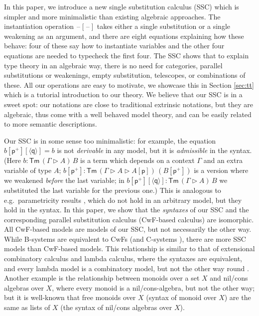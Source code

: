 \documentclass[a4paper,UKenglish,cleveref, autoref, thm-restate]{lipics-v2021}
\newcommand{\Tm}{\mathsf{Tm}}
\newcommand{\p}{\mathsf{p}}
\newcommand{\q}{\mathsf{q}}
\newcommand{\ext}{\mathop{\triangleright}}
\newcommand{\blank}{\mathord{\hspace{1pt}\text{--}\hspace{1pt}}} %
\begin{document}
In this paper, we introduce a new single substitution calculus (SSC)
which is simpler and more minimalistic than existing algebraic
approaches. The instantiation operation $\blank[\blank]$ takes either a
single substitution or a single weakening as an argument, and there
are eight equations explaining how these behave: four of these say how
to instantiate variables and the other four equations are needed to
typecheck the first four. The SSC shows that to explain type theory in
an algebraic way, there is no need for categories, parallel
substitutions or weakenings, empty substitution, telescopes, or
combinations of these. All our operations are easy to motivate, we
showcase this in Section \ref{sec:tt} which is a tutorial introduction
to our theory. We believe that our SSC is in a sweet spot: our
notations are close to traditional extrinsic notations, but they are
algebraic, thus come with a well behaved model theory, and can be
easily related to more semantic descriptions.

Our SSC is in some sense too minimalistic: for example, the equation
$b[\p^+][\langle\q\rangle] = b$ is not \emph{derivable} in any model,
but it is \emph{admissible} in the syntax. (Here $b : \Tm\,(\Gamma\ext
A)\,B$ is a term which depends on a context $\Gamma$ and an extra
variable of type $A$; $b[\p^+] : \Tm\,(\Gamma\ext A\ext
A[\p])\,(B[\p^+])$ is a version where we weakened \emph{before} the
last variable; in $b[\p^+][\langle\q\rangle] : \Tm\,(\Gamma\ext A)\,B$
we substituted the last variable for the previous one.)  This is
analogous to e.g.\ parametricity results
\cite{DBLP:journals/jfp/BernardyJP12}, which do not hold in an
arbitrary model, but they hold in the syntax. In this paper, we show
that the \emph{syntaxes} of our SSC and the corresponding parallel
substitution calculus (CwF-based calculus) are isomorphic. All
CwF-based models are models of our SSC, but not
necessarily the other way. While B-systems are equivalent to CwFs (and
C-systems \cite{AHRENS_EMMENEGGER_NORTH_RIJKE_2023}), there are more
SSC models than CwF-based models. This relationship is similar to that
of extensional combinatory calculus and lambda calculus, where the
syntaxes are equivalent, and every lambda model is a combinatory
model, but not the other way round
\cite{DBLP:conf/fscd/AltenkirchKSV23}. Another example is the
relationship between monoids over a set $X$ and nil/cons algebras over
$X$, where every monoid is a nil/cons-algebra, but not the other way;
but it is well-known that free monoids over $X$ (syntax of monoid over
$X$) are the same as lists of $X$ (the syntax of nil/cons algebras
over $X$).
\end{document}
